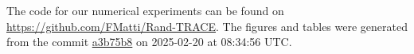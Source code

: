The code for our numerical experiments can be found on \url{https://github.com/FMatti/Rand-TRACE}. The figures and tables were generated from the commit \href{https://github.com/FMatti/Rand-TRACE/tree/a3b75b8}{a3b75b8} on 2025-02-20 at 08:34:56 UTC.
